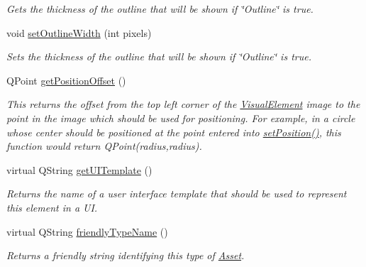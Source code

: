 \begin{DoxyCompactItemize}
\begin{DoxyCompactList}\small\item\em Gets the thickness of the outline that will be shown if \char`\"{}\-Outline\char`\"{} is true. \end{DoxyCompactList}\item 
\hypertarget{class_picto_1_1_token_factory_graphic_a766f777829b4aefc622beebc6b40f774}{void \hyperlink{class_picto_1_1_token_factory_graphic_a766f777829b4aefc622beebc6b40f774}{set\-Outline\-Width} (int pixels)}\label{class_picto_1_1_token_factory_graphic_a766f777829b4aefc622beebc6b40f774}

\begin{DoxyCompactList}\small\item\em Sets the thickness of the outline that will be shown if \char`\"{}\-Outline\char`\"{} is true. \end{DoxyCompactList}\item 
\hypertarget{class_picto_1_1_token_factory_graphic_a71b5942ff3e1318e86470fb9e64b0f0e}{Q\-Point \hyperlink{class_picto_1_1_token_factory_graphic_a71b5942ff3e1318e86470fb9e64b0f0e}{get\-Position\-Offset} ()}\label{class_picto_1_1_token_factory_graphic_a71b5942ff3e1318e86470fb9e64b0f0e}

\begin{DoxyCompactList}\small\item\em This returns the offset from the top left corner of the \hyperlink{struct_picto_1_1_visual_element}{Visual\-Element} image to the point in the image which should be used for positioning. For example, in a circle whose center should be positioned at the point entered into \hyperlink{struct_picto_1_1_visual_element_a454cc96862097e96a0b0f1d2c83e23ed}{set\-Position()}, this function would return Q\-Point(radius,radius). \end{DoxyCompactList}\item 
\hypertarget{class_picto_1_1_token_factory_graphic_a8c0bcda0456cbba4419737b3888ac42f}{virtual Q\-String \hyperlink{class_picto_1_1_token_factory_graphic_a8c0bcda0456cbba4419737b3888ac42f}{get\-U\-I\-Template} ()}\label{class_picto_1_1_token_factory_graphic_a8c0bcda0456cbba4419737b3888ac42f}

\begin{DoxyCompactList}\small\item\em Returns the name of a user interface template that should be used to represent this element in a U\-I. \end{DoxyCompactList}\item 
virtual Q\-String \hyperlink{class_picto_1_1_token_factory_graphic_ace0b9f5d8d2e1f3097672d70cff1598d}{friendly\-Type\-Name} ()
\begin{DoxyCompactList}\small\item\em Returns a friendly string identifying this type of \hyperlink{class_picto_1_1_asset}{Asset}. \end{DoxyCompactList}\end{DoxyCompactItemize}
